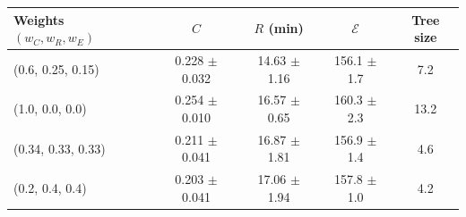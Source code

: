 \begin{tabular}{lcccc}\toprule
Weights $(w_C,w_R,w_E)$ & $C$ & $R$ (min) & $\mathcal{E}$ & Tree size\\\midrule
(0.6, 0.25, 0.15) & 0.228 $\pm$ 0.032 & 14.63 $\pm$ 1.16 & 156.1 $\pm$ 1.7 & 7.2\\
(1.0, 0.0, 0.0) & 0.254 $\pm$ 0.010 & 16.57 $\pm$ 0.65 & 160.3 $\pm$ 2.3 & 13.2\\
(0.34, 0.33, 0.33) & 0.211 $\pm$ 0.041 & 16.87 $\pm$ 1.81 & 156.9 $\pm$ 1.4 & 4.6\\
(0.2, 0.4, 0.4) & 0.203 $\pm$ 0.041 & 17.06 $\pm$ 1.94 & 157.8 $\pm$ 1.0 & 4.2\\
\bottomrule
\end{tabular}